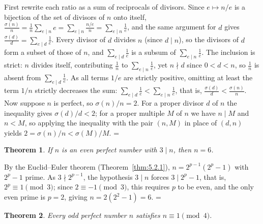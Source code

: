\documentclass[11pt]{article}
\makeatletter
\let\nt@closedisplay\]
\def\nt@guardedclose{\@ifnextchar\par{\nt@closeafterpar}{\@ifnextchar\end{\postdisplaypenalty\@M\nt@closedisplay}{\nt@closedisplay}}}
\def\nt@closeafterpar\par{\@ifnextchar\par{\nt@closeafterpar}{\@ifnextchar\end{\postdisplaypenalty\@M\nt@closedisplay\par}{\nt@closedisplay\par}}}
\renewenvironment{proof}[1][\proofname]{\par
  \pushQED{\qed}\normalfont\topsep\medskipamount\edef\nt@afterproof{\@endparpenalty=\the\@endparpenalty\relax}\@beginparpenalty\@M\@endparpenalty\@M\let\]\nt@guardedclose\trivlist\item[]\textit{#1\@addpunct{.}} \ignorespaces}{\ifvmode\addpenalty\@M\fi\popQED\nt@afterproof\endtrivlist\@endpefalse}
\theoremstyle{ntstyle}
\newtheorem{theorem}{Theorem}[subsection]
\makeatother
\begin{document}
\begin{proof} First rewrite each ratio as a sum of
  reciprocals of divisors. Since $e\mapsto n/e$ is a bijection of the
  set of divisors of $n$ onto itself,
  $\tfrac{\sigma(n)}{n}=\tfrac{1}{n}\sum_{e\mid n}e=\sum_{e\mid n}\tfrac{n/e}{n}=\sum_{e\mid n}\tfrac{1}{e}$, and
  the same argument
  for $d$ gives $\tfrac{\sigma(d)}{d}=\sum_{e\mid d}\tfrac{1}{e}$.
  Every divisor of $d$ divides $n$ (since $d\mid n$), so
  the divisors of $d$ form a subset of those of $n$, and
  $\sum_{e\mid d}\tfrac{1}{e}$ is a subsum of
  $\sum_{e\mid n}\tfrac{1}{e}$. The inclusion is strict: $n$
  divides itself, contributing $\tfrac{1}{n}$ to $\sum_{e\mid n}\tfrac{1}{e}$, yet $n\nmid d$ since $0<d<n$, so
  $\tfrac{1}{n}$ is absent
  from $\sum_{e\mid d}\tfrac{1}{e}$. As all terms $1/e$ are strictly
  positive, omitting at least the term $1/n$ strictly decreases the
  sum: $\sum_{e\mid d}\tfrac{1}{e}<\sum_{e\mid n}\tfrac{1}{e}$, that is,
  $\tfrac{\sigma(d)}{d}<\tfrac{\sigma(n)}{n}$. Now suppose $n$ is
  perfect, so $\sigma(n)/n=2$. For a proper divisor $d$ of $n$ the
  inequality gives $\sigma(d)/d<2$; for a proper multiple $M$ of $n$ we
  have $n\mid M$ and $n<M$, so applying the inequality with the pair
  $(n,M)$ in place of $(d,n)$ yields $2=\sigma(n)/n<\sigma(M)/M$.
\end{proof}

\begin{theorem}\label{thm:5.2.3} If $n$ is an even perfect number with $3\mid n$, then $n=6$.

\end{theorem}

\begin{proof} By the Euclid--Euler theorem (Theorem~\ref{thm:5.2.1}), $n=2^{p-1}(2^{p}-1)$ with $2^{p}-1$ prime. As $3\nmid 2^{p-1}$, the hypothesis $3\mid n$ forces $3\mid 2^{p}-1$, that is, $2^{p}\equiv1\pmod{3}$; since $2\equiv-1\pmod{3}$, this requires $p$ to be even,
  and the only even prime is $p=2$, giving $n=2(2^{2}-1)=6$.
\end{proof}

\begin{theorem}\label{thm:5.2.4} Every odd perfect number $n$ satisfies
  $n\equiv1\pmod{4}$.

\end{theorem}
\end{document}
